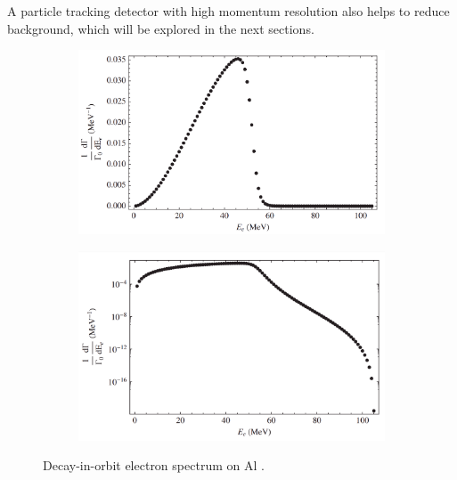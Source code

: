 A particle tracking detector with high momentum resolution 
also helps to reduce background, which will be explored in the next sections.

\begin{figure}[!h]
     \begin{subfigure}[b]{0.4\linewidth}
         \centering
         \includegraphics[scale = 0.18]{figures/png/Screenshot_20240222_175415.png}
         \label{fig:linearscalemichel}
     \end{subfigure}
     \begin{subfigure}[b]{0.7\linewidth}
         \centering
         \includegraphics[scale = 0.18]{figures/png/Screenshot_20240222_175446.png}
         \label{fig:logscalemichel}
     \end{subfigure}
     \caption[Decay-in-orbit spectrum on aluminium.]{
       Decay-in-orbit electron spectrum on Al \cite{PhysRevD.84.013006}.}
        \label{fig:michel}
\end{figure}

